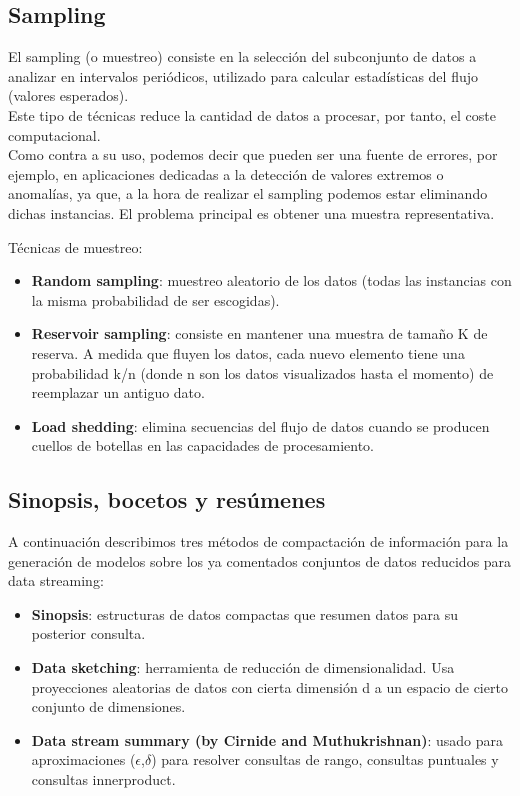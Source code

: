 \subsection{Sampling}

El sampling (o muestreo) consiste en la selección del subconjunto de datos a analizar en intervalos periódicos, utilizado para calcular estadísticas del flujo (valores esperados).\\
Este tipo de técnicas reduce la cantidad de datos a procesar, por tanto, el coste computacional.\\
Como contra a su uso, podemos decir que pueden ser una fuente de errores, por ejemplo, en aplicaciones dedicadas a la detección de valores extremos o anomalías, ya que, a la hora de realizar el sampling podemos estar eliminando dichas instancias. El problema principal es obtener una muestra representativa.


Técnicas de muestreo:
\begin{itemize}
	\item \textbf{Random sampling}: muestreo aleatorio de los datos (todas las instancias con la misma probabilidad de ser escogidas).
	\item \textbf{Reservoir sampling}: consiste en mantener una muestra de tamaño K de reserva. A medida que fluyen los datos, cada nuevo elemento tiene una probabilidad k/n (donde n son los datos visualizados hasta el momento) de reemplazar un antiguo dato.
	\item \textbf{Load shedding}: elimina secuencias del flujo de datos cuando se producen cuellos de botellas en las capacidades de procesamiento.
\end{itemize}

\subsection{Sinopsis, bocetos y resúmenes}
A continuación describimos tres métodos de compactación de información para la generación de modelos sobre los ya comentados conjuntos de datos reducidos para data streaming:

\begin{itemize}
	\item \textbf{Sinopsis}: estructuras de datos compactas que resumen datos para su posterior consulta.
	\item \textbf{Data sketching}: herramienta de reducción de dimensionalidad. Usa proyecciones aleatorias de datos con cierta dimensión d a un espacio de cierto conjunto de dimensiones.
	\item \textbf{Data stream summary (by Cirnide and Muthukrishnan)}: usado para aproximaciones ($\epsilon$,$\delta$) para resolver consultas de rango, consultas puntuales y consultas innerproduct.
\end{itemize}





